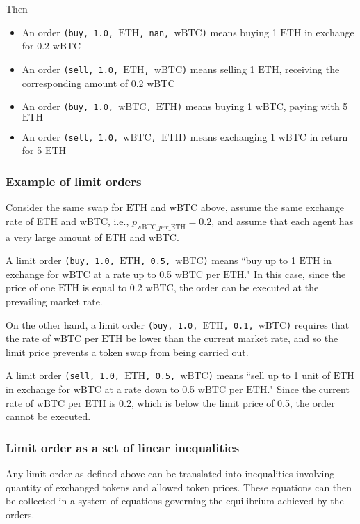 \documentclass[11pt, reqno]{amsart}
\newcommand{\BTC}{\mathrm{wBTC}}
\newcommand{\ETH}{\mathrm{ETH}}
\begin{document}
Then
\begin{itemize}
    \item An order \texttt{(buy, 1.0, $\ETH$, nan, $\BTC$)} means buying 1
      $\ETH$ in exchange for 0.2 $\BTC$
    \item An order \texttt{(sell, 1.0, $\ETH$, $\BTC$)} means selling 1 $\ETH$,
      receiving the corresponding amount of 0.2 $\BTC$
    \item An order \texttt{(buy, 1.0, $\BTC$, $\ETH$)} means buying 1 $\BTC$,
      paying with 5 $\ETH$
    \item An order \texttt{(sell, 1.0, $\BTC$, $\ETH$)} means exchanging
      1 $\BTC$ in return for 5 $\ETH$
\end{itemize}

\subsubsection{Example of limit orders}
Consider the same swap for $\ETH$ and $\BTC$ above, assume the same exchange
rate of ETH and wBTC, i.e., $p_{\BTC\_per\_\ETH} = 0.2$, and assume that each
agent has a very large amount of $\ETH$ and $\BTC$.

A limit order \texttt{(buy, 1.0, $\ETH$, 0.5, $\BTC$)} means
``buy up to 1 $\ETH$ in exchange for $\BTC$ at a rate up to 0.5 $\BTC$ per $\ETH$."
In this case, since the price of one $\ETH$ is equal to 0.2 $\BTC$, the order
can be executed at the prevailing market rate.

On the other hand, a limit order \texttt{(buy, 1.0, $\ETH$, 0.1, $\BTC$)}
requires that the rate of $\BTC$ per $\ETH$ be lower than the current market
rate, and so the limit price prevents a token swap from being carried out.

A limit order \texttt{(sell, 1.0, $\ETH$, 0.5, $\BTC$)} means
``sell up to 1 unit of $\ETH$ in exchange for $\BTC$ at a rate down to 0.5 $\BTC$ per $\ETH$."
Since the current rate of $\BTC$ per $\ETH$ is 0.2, which is below the limit
price of 0.5, the order cannot be executed.

\subsubsection{Limit order as a set of linear inequalities}
Any limit order as defined above can be translated into inequalities involving
quantity of exchanged tokens and allowed token prices. These equations can then
be collected in a system of equations governing the equilibrium achieved by the
orders.
\end{document}
